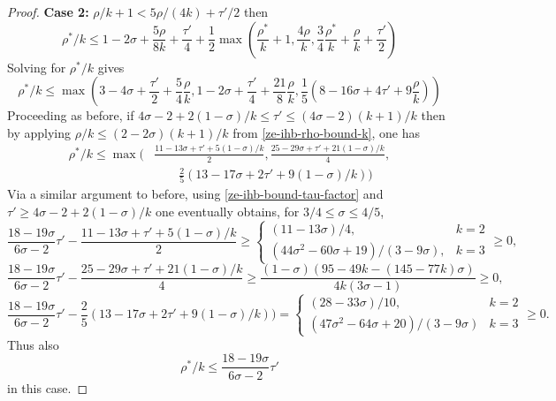 \begin{proof}
\textbf{Case 2:} $\rho/k + 1 < 5\rho/(4k) + \tau'/2$ then 
\[
\rho^*/k \leq 1-2\sigma + \frac{5\rho}{8k} + \frac{\tau'}{4} + \frac{1}{2}\max(\frac{\rho^*}{k}+1, \frac{4\rho}{k}, \frac{3}{4}\frac{\rho^*}{k} + \frac{\rho}{k}+\frac{\tau'}{2})
\]
Solving for $\rho^*/k$ gives 
\[
\rho^*/k \le \max(3 - 4\sigma + \frac{\tau'}{2} + \frac{5}{4}\frac{\rho}{k}, 1 - 2\sigma + \frac{\tau'}{4} + \frac{21}{8}\frac{\rho}{k}, \frac{1}{5}(8 - 16\sigma + 4\tau' + 9\frac{\rho}{k}))
\]
Proceeding as before, if $4\sigma - 2 + 2(1 - \sigma)/k \le \tau' \le (4\sigma - 2)(k + 1)/k$ then by applying $\rho/k \le (2 - 2\sigma)(k + 1)/k$ from \eqref{ze-ihb-rho-bound-k}, one has
\begin{align*}
\rho^*/k \le \max(&\frac{11 - 13\sigma + \tau' + 5(1 - \sigma)/k}{2}, \frac{25 - 29\sigma + \tau' + 21(1-\sigma)/k}{4},\\
&\qquad\frac{2}{5}(13 - 17 \sigma + 2\tau' + 9 (1 - \sigma)/k))
\end{align*}
Via a similar argument to before, using \eqref{ze-ihb-bound-tau-factor} and $\tau' \ge 4\sigma - 2 + 2(1 - \sigma)/k$ one eventually obtains, for $3/4 \le \sigma \le 4/5$,
\[
\frac{18 - 19\sigma}{6\sigma - 2}\tau' - \frac{11 - 13\sigma + \tau' + 5(1 - \sigma)/k}{2} \ge \begin{cases}
(11 - 13\sigma)/4,&k = 2\\
(44\sigma^2 - 60\sigma + 19)/(3 - 9\sigma),&k=3
\end{cases}\ge 0,
\]
\[
\frac{18 - 19\sigma}{6\sigma - 2}\tau' - \frac{25 - 29\sigma + \tau' + 21(1-\sigma)/k}{4} \ge \frac{(1 - \sigma) (95 - 49 k - (145 - 77 k)\sigma)}{4 k (3\sigma - 1)} \ge 0,
\]
\[
\frac{18 - 19\sigma}{6\sigma - 2}\tau' - \frac{2}{5}(13 - 17 \sigma + 2\tau' + 9(1 - \sigma)/k)) = \begin{cases}
(28 - 33\sigma)/10,&k = 2\\
(47\sigma^2 - 64\sigma + 20)/(3 - 9\sigma)&k=3
\end{cases}\ge 0.
\]
Thus also 
\[
\rho^*/k \le \frac{18 - 19\sigma}{6\sigma - 2}\tau'
\]
in this case. 


\end{proof}
